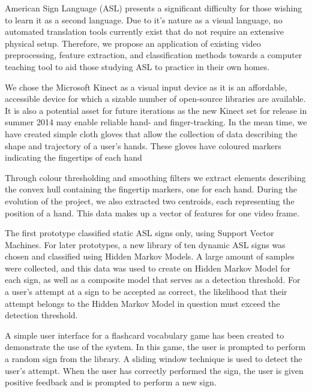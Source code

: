 \documentclass[12pt]{article}
\begin{document}


American Sign Language (ASL) presents a significant difficulty for those wishing to learn it as
a second language. Due to it’s nature as a visual language, no automated translation tools currently exist that do not require an extensive physical setup. Therefore, we propose an application of existing video preprocessing, feature extraction, and classification methods towards a computer teaching tool to aid those studying ASL to practice in their own homes. 
	
We chose the Microsoft Kinect as a visual input device as it is an affordable, accessible device for which a sizable number of open-source libraries are available. It is also a potential asset for future iterations as the new Kinect set for release in summer 2014 may enable reliable hand- and finger-tracking. In the mean time, we have created simple cloth gloves that allow the collection of data describing the shape and trajectory of a user’s hands. These gloves have coloured markers indicating the fingertips of each hand
	
Through colour thresholding and smoothing filters we extract elements describing the convex hull containing the fingertip markers, one for each hand. During the evolution of the project, we also extracted two centroids, each  representing the position of a hand. This data makes up a vector of features for one video frame.
	
The first prototype classified static ASL signs only, using Support Vector Machines. For later prototypes, a new library of ten dynamic ASL signs was chosen and classified using Hidden Markov Models. A large amount of samples were collected, and this data was used to create on Hidden Markov Model for each sign, as well as a composite model that serves as a detection threshold. For a user’s attempt at a sign to be accepted as correct, the likelihood that their attempt belongs to the Hidden Markov Model in question must exceed the detection threshold.
	
A simple user interface for a flashcard vocabulary game has been created to demonstrate the use of the system. In this game, the user is prompted to perform a random sign from the library. A sliding window technique is used to detect the user’s attempt. When the user has correctly performed the sign, the user is given positive feedback and is prompted to perform a new sign.
	
\end{document}
